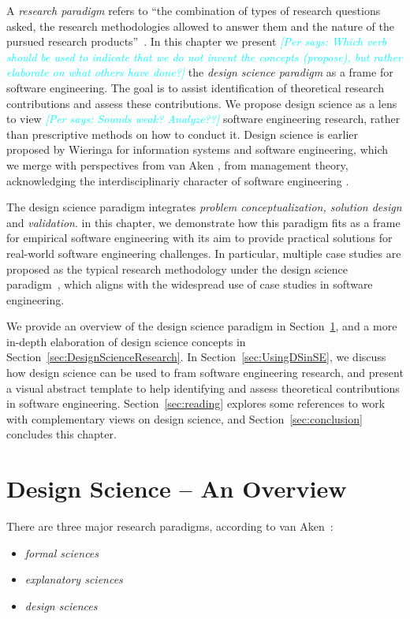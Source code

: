 \documentclass[graybox]{svmult}
\newcommand{\per}[1]{\textcolor{cyan}{{\it [Per says: #1]}}}
\newcommand{\per}[1]{}
\begin{document}
A \emph{research paradigm} refers to ``the combination of types of research questions asked, the research methodologies allowed to answer them and the nature of the pursued research products''~\cite{van_aken_management_2004}. In this chapter we present \per{Which verb should be used to indicate that we do not invent the concepts (propose), but rather elaborate on what others have done?} the \emph{design science paradigm} as a frame for software engineering. The goal is to assist identification of theoretical research contributions and assess these contributions. We propose design science as a lens to view \per{Sounds weak? Analyze??} software engineering research, rather than prescriptive methods on how to conduct it. 
Design science is earlier proposed by Wieringa \cite{wieringa_what_2014} for information systems and software engineering, which we merge with perspectives from van Aken \cite{van_aken_management_2004}, from management theory, acknowledging the interdisciplinariy character of software engineering \cite{Mendez2019}.

The design science paradigm integrates \emph{problem conceptualization, solution design} and \emph{validation}. in this chapter, we demonstrate how this paradigm fits as a frame for empirical software engineering with its aim to provide practical solutions for real-world software engineering challenges. In particular, multiple case studies are proposed as the typical research methodology under the design science paradigm~\cite{van_aken_management_2004}, which aligns with the widespread use of case studies in software engineering. 

We provide an overview of the design science paradigm in Section~\ref{sec:overview}, and a more in-depth elaboration of design science concepts in Section~\ref{sec:DesignScienceResearch}. In Section~\ref{sec:UsingDSinSE}, we discuss how  design science can be used to fram software engineering research, and present a visual abstract template to help identifying and assess theoretical contributions in software engineering. Section~\ref{sec:reading} explores some references to work with complementary views on design science, and Section~\ref{sec:conclusion} concludes this chapter.


\section{Design Science -- An Overview}
\label{sec:overview}

There are three major research paradigms, according to van Aken~\cite{van_aken_management_2004}:
\begin{itemize}
\item \emph{formal sciences} %
\item \emph{explanatory sciences} %
\item \emph{design sciences}%
\end{itemize}
\end{document}
